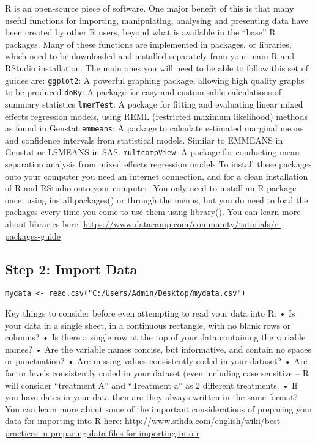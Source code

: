 \documentclass[]{book}
\theoremstyle{definition}
\theoremstyle{definition}
\theoremstyle{definition}
\theoremstyle{remark}
\begin{document}
R is an open-source piece of software. One major benefit of this is that
many useful functions for importing, manipulating, analysing and
presenting data have been created by other R users, beyond what is
available in the ``base'' R packages. Many of these functions are
implemented in packages, or libraries, which need to be downloaded and
installed separately from your main R and RStudio installation. The main
ones you will need to be able to follow this set of guides are:
\texttt{ggplot2}: A powerful graphing package, allowing high quality
graphs to be produced \texttt{doBy}: A package for easy and customisable
calculations of summary statistics \texttt{lmerTest}: A package for
fitting and evaluating linear mixed effects regression models, using
REML (restricted maximum likelihood) methods as found in Genstat
\texttt{emmeans}: A package to calculate estimated marginal means and
confidence intervals from statistical models. Similar to EMMEANS in
Genstat or LSMEANS in SAS. \texttt{multcompView}: A package for
conducting mean separation analysis from mixed effects regression models
To install these packages onto your computer you need an internet
connection, and for a clean installation of R and RStudio onto your
computer. You only need to install an R package once, using
install.packages() or through the menus, but you do need to load the
packages every time you come to use them using library(). You can learn
more about libraries here:
\url{https://www.datacamp.com/community/tutorials/r-packages-guide}

\subsection{Step 2: Import Data}\label{step-2-import-data-1}

\begin{verbatim}
mydata <- read.csv("C:/Users/Admin/Desktop/mydata.csv")
\end{verbatim}

Key things to consider before even attempting to read your data into R:
• Is your data in a single sheet, in a continuous rectangle, with no
blank rows or columns? • Is there a single row at the top of your data
containing the variable names? • Are the variable names concise, but
informative, and contain no spaces or punctuation? • Are missing values
consistently coded in your dataset? • Are factor levels consistently
coded in your dataset (even including case sensitive -- R will consider
``treatment A'' and ``Treatment a'' as 2 different treatments. • If you
have dates in your data then are they always written in the same format?
You can learn more about some of the important considerations of
preparing your data for importing into R here:
\url{http://www.sthda.com/english/wiki/best-practices-in-preparing-data-files-for-importing-into-r}
\end{document}
